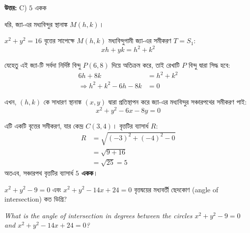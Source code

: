\documentclass[12pt, a4paper]{article}
\begin{document}
\vspace{0.5em}
\begin{tcolorbox}[answerbox]
    \textbf{\color{success} উত্তর:} C) $5$ একক
\end{tcolorbox}
\vspace{1em}

\begin{tcolorbox}[solutionbox={সমাধান (Solution)}]
    \noindent
    ধরি, জ্যা-এর মধ্যবিন্দুর স্থানাঙ্ক $M(h, k)$।
    
    $x^2 + y^2 = 16$ বৃত্তের সাপেক্ষে $M(h, k)$ মধ্যবিন্দুগামী জ্যা-এর সমীকরণ $T = S_1$:
    \[ xh + yk = h^2 + k^2 \]
    
    যেহেতু এই জ্যা-টি সর্বদা নির্দিষ্ট বিন্দু $P(6, 8)$ দিয়ে অতিক্রম করে, তাই রেখাটি $P$ বিন্দু দ্বারা সিদ্ধ হবে:
    \begin{align*}
        6h + 8k &= h^2 + k^2 \\
        \Rightarrow h^2 + k^2 - 6h - 8k &= 0
    \end{align*}
    
    এখন, $(h, k)$ কে সাধারণ স্থানাঙ্ক $(x, y)$ দ্বারা প্রতিস্থাপন করে জ্যা-এর মধ্যবিন্দুর সঞ্চারপথের সমীকরণ পাই:
    \[ x^2 + y^2 - 6x - 8y = 0 \]
    
    এটি একটি বৃত্তের সমীকরণ, যার কেন্দ্র $C(3, 4)$। 
    বৃত্তটির ব্যাসার্ধ $R$:
    \begin{align*}
        R &= \sqrt{(-3)^2 + (-4)^2 - 0} \\
          &= \sqrt{9 + 16} \\
          &= \sqrt{25} = 5
    \end{align*}
    অতএব, সঞ্চারপথ বৃত্তটির ব্যাসার্ধ \textbf{$5$ একক}।
\end{tcolorbox}

\vspace{2em}

\begin{tcolorbox}[questionbox={প্রশ্ন (Question) 12}]
    \noindent
    $x^2 + y^2 - 9 = 0$ এবং $x^2 + y^2 - 14x + 24 = 0$ বৃত্তদ্বয়ের মধ্যবর্তী ছেদকোণ (angle of intersection) কত ডিগ্রি?
    
    \vspace{0.8em}
    \begin{english}
    \noindent\textit{\color{darkgray}
    What is the angle of intersection in degrees between the circles $x^2 + y^2 - 9 = 0$ and $x^2 + y^2 - 14x + 24 = 0$?
    }
    \end{english}
\end{tcolorbox}
\end{document}
